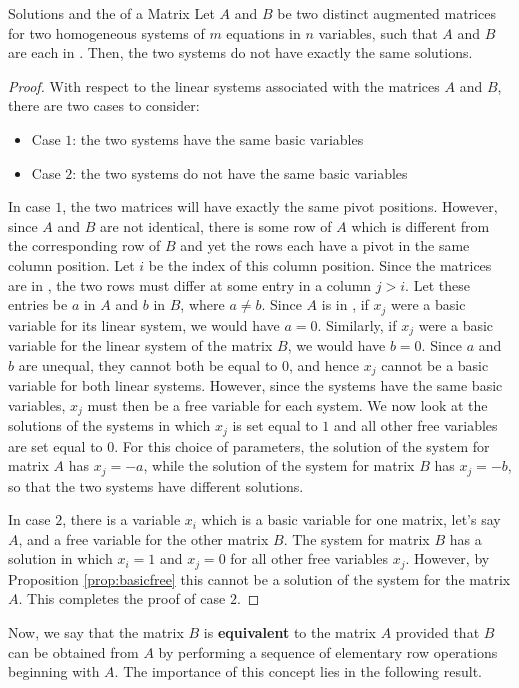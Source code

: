 \begin{lemma}{Solutions and the \RREF \;of a Matrix}\label{lem:rrefsolutions}
Let $A$ and $B$ be two distinct augmented matrices for two homogeneous systems of $m$ equations in $n$ variables, such that $A$ and $B$ are each in \rref. Then, the two systems do not have exactly the same solutions.
\end{lemma}
\ifdefined\showproofs
\begin{proof}
With respect to the linear systems associated with the matrices $A$ and $B$, there are two cases to consider:
\begin{itemize}
\item Case $1$: the two systems have the same basic variables
\item Case $2$: the two systems do not have the same basic variables
\end{itemize}
In case $1$, the two matrices will have exactly the same pivot positions. However, since $A$ and $B$ are not identical, there is some row of $A$ which is different from the corresponding row of $B$ and yet the rows each have a pivot in the same column position. Let $i$ be the index of this column position. Since the matrices are in \rref, the two rows must differ at some entry in a column $j>i$. Let these entries be $a$ in $A$ and $b$ in $B$, where $a \neq b$. Since $A$ is in \rref, if $x_j$ were a basic variable for its linear system, we would have $a=0$. Similarly, if $x_j$ were a basic variable for the linear system of the matrix $B$, we would have $b=0$. Since $a$ and $b$ are unequal, they cannot both be equal to $0$, and hence $x_j$ cannot be a basic variable for both linear systems. However, since the systems have the same basic variables, $x_j$ must then be a free variable for each system. We now look at the solutions of the systems in which $x_j$ is set equal to $1$ and all other free variables are set equal to $0$. For this choice of parameters, the solution of the system for matrix $A$ has $x_j=-a$, while the solution of the system for matrix $B$ has $x_j=-b$, so that the two systems have different solutions.

In case $2$, there is a variable $x_i$ which is a basic variable for one matrix, let's say $A$, and a free variable for the other matrix $B$. The system for matrix $B$ has a solution in which $x_i=1$ and $x_j=0$ for all other free variables $x_j$. However, by Proposition \ref{prop:basicfree} this cannot be a solution of the system for the matrix $A$. This completes the proof of case $2$.
\end{proof}
\fi
Now, we say that the matrix $B$ is \textbf{equivalent}  to the matrix $A$ provided that $B$ can be obtained from $A$ by performing a sequence of elementary row operations beginning with $A$. The importance of this concept lies in the following result.

